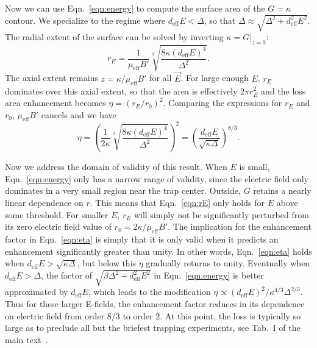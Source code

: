 \documentclass[%
 reprint,
 amsmath,amssymb,
 aps,
prl,
]{revtex4-1}
\begin{document}
Now we can use Eqn.~\ref{eqn:energy} to compute the surface area of the $G=\kappa$ contour.
We specialize to the regime where $d_\text{eff}E<\Delta$, so that $\Delta\approx\sqrt{\Delta^2+d_\text{eff}^2E^2}$. 
The radial extent of the surface can be solved by inverting $\kappa=G|_{z=0}$:
\begin{equation}
\label{eqn:rE}
r_E = \frac{1}{\mu_\text{eff}B'}\sqrt[3]{\frac{8\kappa(d_\text{eff}E)^4}{\Delta^2}}.
\end{equation}
The axial extent remains $z=\kappa/\mu_\text{eff}B'$ for all $\vec{E}$.
For large enough $E$, $r_E$ dominates over this axial extent, so that the area is effectively $2\pi r_E^2$ and the loss area enhancement becomes $\eta = (r_E/r_0)^2$.
Comparing the expressions for $r_E$ and $r_0$, $\mu_\text{eff}B'$ cancels and we have
\begin{equation}
\label{eqn:eta}
\eta= \left(\frac{1}{2\kappa}\sqrt[3]{\frac{8\kappa(d_\text{eff}E)^4}{\Delta^2}}\right)^2=\left(\frac{d_\text{eff}E}{\sqrt{\kappa\Delta}}\right)^{8/3}.
\end{equation}

Now we address the domain of validity of this result. 
When $E$ is small, Eqn.~\ref{eqn:energy} only has a narrow range of validity, since the electric field only dominates in a very small region near the trap center. 
Outside, $G$ retains a nearly linear dependence on $r$. 
This means that Eqn.~\ref{eqn:rE} only holds for $E$ above some threshold. 
For smaller $E$, $r_E$ will simply not be significantly perturbed from its zero electric field value of $r_0=2\kappa/\mu_\text{eff}B'$.
The implication for the enhancement factor in Eqn.~\ref{eqn:eta} is simply that it is only valid when it predicts an enhancement significantly greater than unity.
In other words, Eqn.~\ref{eqn:eta} holds when $d_\text{eff}E>\sqrt{\kappa\Delta}$, but below this $\eta$ gradually returns to unity.
Eventually when $d_\text{eff}E>\Delta$, the factor of $\sqrt{\beta\Delta^2+d_\text{eff}^2E^2}$ in Eqn.~\ref{eqn:energy} is better approximated by $d_\text{eff}E$, which leads to the modification $\eta\propto (d_\text{eff}E)^2/\kappa^{4/3}\Delta^{2/3}$. 
Thus for these larger E-fields, the enhancement factor reduces in its dependence on electric field from order $8/3$ to order $2$.
At this point, the loss is typically so large as to preclude all but the briefest trapping experiments, see Tab.~I of the main text~\cite{smt}.





\end{document}
